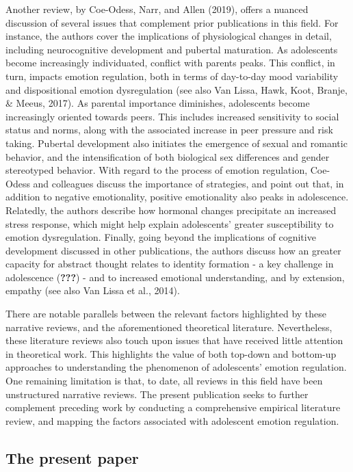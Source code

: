 \documentclass[
  english,
  man]{apa6}
\begin{document}
Another review, by Coe-Odess, Narr, and Allen (2019), offers a nuanced
discussion of several issues that complement prior publications in this field.
For instance, the authors cover the implications of physiological changes in
detail, including neurocognitive development and pubertal maturation. As
adolescents become increasingly individuated, conflict with parents peaks. This
conflict, in turn, impacts emotion regulation, both in terms of day-to-day mood
variability and dispositional emotion dysregulation (see also Van Lissa, Hawk, Koot, Branje, \& Meeus, 2017). As parental importance diminishes,
adolescents become increasingly oriented towards peers. This includes increased
sensitivity to social status and norms, along with the associated increase in
peer pressure and risk taking. Pubertal development also initiates the
emergence of sexual and romantic behavior, and the intensification of both
biological sex differences and gender stereotyped behavior. With regard to the
process of emotion regulation, Coe-Odess and colleagues discuss the importance
of strategies, and point out that, in addition to negative emotionality,
positive emotionality also peaks in adolescence. Relatedly, the authors
describe how hormonal changes precipitate an increased stress response, which
might help explain adolescents' greater susceptibility to emotion
dysregulation. Finally, going beyond the implications of cognitive development
discussed in other publications, the authors discuss how an greater capacity
for abstract thought relates to identity formation - a key challenge in
adolescence ({\textbf{???}}) - and to increased emotional
understanding, and by extension, empathy (see also Van Lissa et al., 2014).

There are notable parallels between the relevant factors highlighted by these
narrative reviews, and the aforementioned theoretical literature. Nevertheless,
these literature reviews also touch upon issues that have received little
attention in theoretical work. This highlights the value of both top-down and
bottom-up approaches to understanding the phenomenon of adolescents' emotion
regulation. One remaining limitation is that, to date, all reviews in this
field have been unstructured narrative reviews. The present publication seeks
to further complement preceding work by conducting a comprehensive empirical
literature review, and mapping the factors associated with adolescent emotion
regulation.

\hypertarget{the-present-paper}{%
\subsection{The present paper}\label{the-present-paper}}
\end{document}
